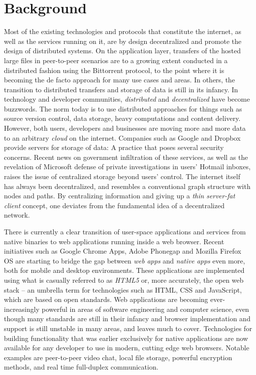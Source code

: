 \section{Background}
Most of the existing technologies and protocols that constitute the internet, as well as the services running on it, are by design decentralized and promote the design of distributed systems. On the application layer, transfers of the hosted large files in peer-to-peer scenarios are to a growing extent conducted in a distributed fashion using the Bittorrent protocol, to the point where it is becoming the de facto approach for many use cases and areas. In others, the transition to distributed transfers and storage of data is still in its infancy. In technology and developer communities, \emph{distributed} and \emph{decentralized} have become buzzwords. The norm today is to use distributed approaches for things such as source version control, data storage, heavy computations and content delivery.
However, both users, developers and businesses are moving more and more data to an arbitrary \emph{cloud} on the internet. Companies such as Google and Dropbox provide servers for storage of data: A practice that poses several security concerns. Recent news on government infiltration of these services, as well as the revelation of Microsoft  defense of private investigations in users' Hotmail inboxes, raises the issue of centralized storage beyond users' control. The internet itself has always been decentralized, and resembles a conventional graph structure with nodes and paths. By centralizing information and giving up a \emph{thin server-fat client} concept, one deviates from the fundamental idea of a decentralized network.

There is currently a clear transition of user-space applications and services from native binaries to web applications running inside a web browser. Recent initiatives such as Google Chrome Apps, Adobe Phonegap and Mozilla Firefox OS are starting to bridge the gap between \emph{web apps} and \emph{native apps} even more, both for mobile and desktop environments. These applications are implemented using what is casually referred to as \emph{HTML5} or, more accurately, the open web stack – an umbrella term for technologies such as HTML, CSS and JavaScript, which are based on open standards. Web applications are becoming ever-increasingly powerful in areas of software engineering and computer science, even though many standards are still in their infancy and browser implementation and support is still unstable in many areas, and leaves much to cover. Technologies for building functionality that was earlier exclusively for native applications are now available for any developer to use in modern, cutting edge web browsers. Notable examples are peer-to-peer video chat, local file storage, powerful encryption methods, and real time full-duplex communication.

